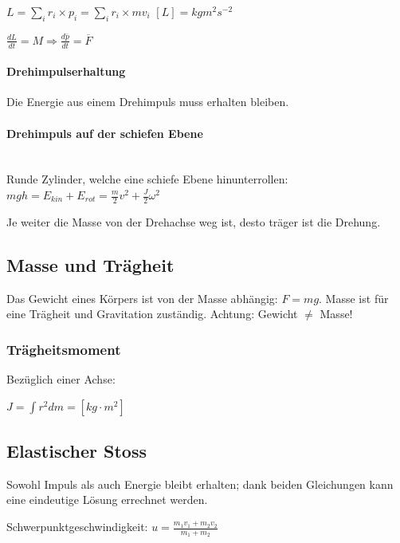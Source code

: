 \documentclass[a4paper]{scrartcl}
\begin{document}
	$L = \sum_i{r_i \times p_i} = \sum_i{r_i \times mv_i}$
	$\left[ L \right] = kg m^2 s^{-2}$
	
	$\frac{dL}{dt} = M \Rightarrow \frac{d\overline{p}}{dt} = \overline{F}$
	


	\paragraph{Drehimpulserhaltung}
	
	Die Energie aus einem Drehimpuls muss erhalten bleiben.
	
	
	\paragraph{Drehimpuls auf der schiefen Ebene} \hfill \\
	
	Runde Zylinder, welche eine schiefe Ebene hinunterrollen: $mgh = E_{kin} + E_{rot} =\frac{m}{2} v^2 + \frac{J}{2} \omega^2$
	
	Je weiter die Masse von der Drehachse weg ist, desto träger ist die Drehung.
	

\subsection{Masse und Trägheit}
	Das Gewicht eines Körpers ist von der Masse abhängig: $F = mg$.
	Masse ist für eine Trägheit und Gravitation zuständig. Achtung: Gewicht $\neq$ Masse!



\subsubsection{Trägheitsmoment}

	
	Bezüglich einer Achse:
	
	$J = \int r^2 d m = \left[ kg \cdot m^2 \right]$

\subsection{Elastischer Stoss}
	Sowohl Impuls als auch Energie bleibt erhalten; dank beiden Gleichungen kann eine eindeutige Lösung errechnet werden.
	
	Schwerpunktgeschwindigkeit: $u = \frac{m_1 v_1 + m_2 v_2}{m_1 + m_2}$ %
\end{document}
